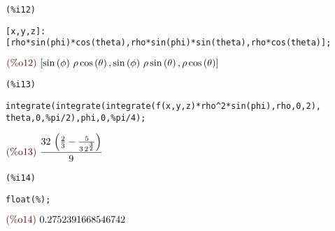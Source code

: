 \documentclass[12pt]{article}
\begin{document}
\noindent
\begin{minipage}[t]{8ex}{\color{red}\bf
\begin{verbatim}
(%i12) 
\end{verbatim}}
\end{minipage}
\begin{minipage}[t]{\textwidth}{\color{blue}
\begin{verbatim}
[x,y,z]:[rho*sin(phi)*cos(theta),rho*sin(phi)*sin(theta),rho*cos(theta)];
\end{verbatim}}
\end{minipage}
\begin{math}\displaystyle
\parbox{8ex}{\color{labelcolor}(\%o12) }
[\mathrm{sin}\left( \phi\right) \,\rho\,\mathrm{cos}\left( \theta\right) ,\mathrm{sin}\left( \phi\right) \,\rho\,\mathrm{sin}\left( \theta\right) ,\rho\,\mathrm{cos}\left( \theta\right) ]
\end{math}


\noindent
\begin{minipage}[t]{8ex}{\color{red}\bf
\begin{verbatim}
(%i13) 
\end{verbatim}}
\end{minipage}
\begin{minipage}[t]{\textwidth}{\color{blue}
\begin{verbatim}
integrate(integrate(integrate(f(x,y,z)*rho^2*sin(phi),rho,0,2),
theta,0,%pi/2),phi,0,%pi/4);
\end{verbatim}}
\end{minipage}
\begin{math}\displaystyle
\parbox{8ex}{\color{labelcolor}(\%o13) }
\frac{32\,\left( \frac{2}{3}-\frac{5}{3\,{2}^{\frac{3}{2}}}\right) }{9}
\end{math}


\noindent
\begin{minipage}[t]{8ex}{\color{red}\bf
\begin{verbatim}
(%i14) 
\end{verbatim}}
\end{minipage}
\begin{minipage}[t]{\textwidth}{\color{blue}
\begin{verbatim}
float(%);
\end{verbatim}}
\end{minipage}
\begin{math}\displaystyle
\parbox{8ex}{\color{labelcolor}(\%o14) }
0.2752391668546742
\end{math}
\end{document}
